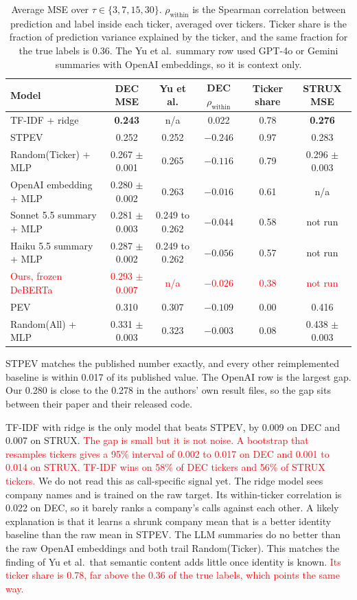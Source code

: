 \documentclass{article}
\newcommand{\new}[1]{\textcolor{red}{#1}}
\begin{document}
\begin{table}[h]
\centering
\small
\setlength{\tabcolsep}{4pt}
\begin{tabular}{lccccc}
\toprule
Model & DEC MSE & Yu et al. & DEC $\rho_{\text{within}}$ & Ticker share & STRUX MSE \\
\midrule
TF-IDF + ridge & \textbf{0.243} & n/a & 0.022 & 0.78 & \textbf{0.276} \\
STPEV & 0.252 & 0.252 & $-0.246$ & 0.97 & 0.283 \\
Random(Ticker) + MLP & 0.267 $\pm$ 0.001 & 0.265 & $-0.116$ & 0.79 & 0.296 $\pm$ 0.003 \\
OpenAI embedding + MLP & 0.280 $\pm$ 0.002 & 0.263 & $-0.016$ & 0.61 & n/a \\
Sonnet 5.5 summary + MLP & 0.281 $\pm$ 0.003 & 0.249 to 0.262 & $-0.044$ & 0.58 & not run \\
Haiku 5.5 summary + MLP & 0.287 $\pm$ 0.002 & 0.249 to 0.262 & $-0.056$ & 0.57 & not run \\
\new{Ours, frozen DeBERTa} & \new{0.293 $\pm$ 0.007} & \new{n/a} & \new{$-0.026$} & \new{0.38} & \new{not run} \\
PEV & 0.310 & 0.307 & $-0.109$ & 0.00 & 0.416 \\
Random(All) + MLP & 0.331 $\pm$ 0.003 & 0.323 & $-0.003$ & 0.08 & 0.438 $\pm$ 0.003 \\
\bottomrule
\end{tabular}
\caption{Average MSE over $\tau\in\{3,7,15,30\}$. $\rho_{\text{within}}$ is the Spearman correlation between prediction and label inside each ticker, averaged over tickers. Ticker share is the fraction of prediction variance explained by the ticker, and the same fraction for the true labels is 0.36. The Yu et al.\ summary row used GPT-4o or Gemini summaries with OpenAI embeddings, so it is context only.}
\label{tab:baselines}
\end{table}

STPEV matches the published number exactly, and every other reimplemented baseline is within 0.017 of its published value. The OpenAI row is the largest gap. Our 0.280 is close to the 0.278 in the authors' own result files, so the gap sits between their paper and their released code.

TF-IDF with ridge is the only model that beats STPEV, by 0.009 on DEC and 0.007 on STRUX. \new{The gap is small but it is not noise. A bootstrap that resamples tickers gives a 95\% interval of 0.002 to 0.017 on DEC and 0.001 to 0.014 on STRUX. TF-IDF wins on 58\% of DEC tickers and 56\% of STRUX tickers.} We do not read this as call-specific signal yet. The ridge model sees company names and is trained on the raw target. Its within-ticker correlation is 0.022 on DEC, so it barely ranks a company's calls against each other. A likely explanation is that it learns a shrunk company mean that is a better identity baseline than the raw mean in STPEV. The LLM summaries do no better than the raw OpenAI embeddings and both trail Random(Ticker). This matches the finding of Yu et al.\ that semantic content adds little once identity is known. \new{Its ticker share is 0.78, far above the 0.36 of the true labels, which points the same way.}
\end{document}
